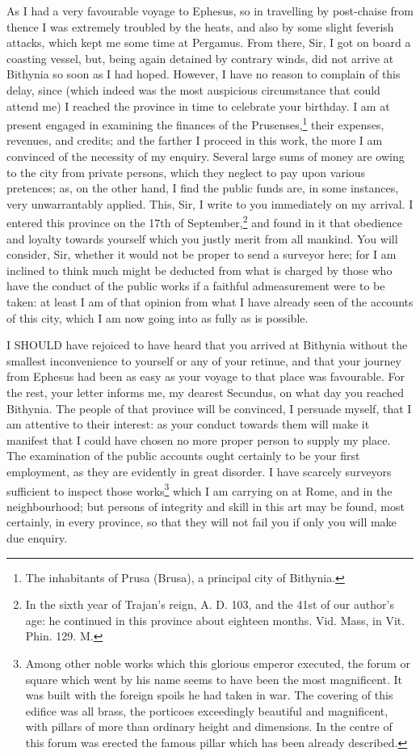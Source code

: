 As I had a very favourable voyage to Ephesus, so in travelling by
post-chaise from thence I was extremely troubled by the heats, and also by
some slight feverish attacks, which kept me some time at Pergamus. From
there, Sir, I got on board a coasting vessel, but, being again detained by
contrary winds, did not arrive at Bithynia so soon as I had hoped.
However, I have no reason to complain of this delay, since (which indeed
was the most auspicious circumstance that could attend me) I reached the
province in time to celebrate your birthday. I am at present engaged in
examining the finances of the Prusenses,\footnote{The inhabitants of
Prusa (Brusa), a principal city of Bithynia.} their expenses,
revenues, and credits; and the farther I proceed in this work, the more I
am convinced of the necessity of my enquiry. Several large sums of money
are owing to the city from private persons, which they neglect to pay upon
various pretences; as, on the other hand, I find the public funds are, in
some instances, very unwarrantably applied. This, Sir, I write to you
immediately on my arrival. I entered this province on the 17th of
September,\footnote{In the sixth year of
Trajan's reign, A. D. 103, and the 41st of our author's age: he continued
in this province about eighteen months. Vid. Mass, in Vit. Phin. 129. M.} and found in it that obedience and
loyalty towards yourself which you justly merit from all mankind. You will
consider, Sir, whether it would not be proper to send a surveyor here; for
I am inclined to think much might be deducted from what is charged by
those who have the conduct of the public works if a faithful admeasurement
were to be taken: at least I am of that opinion from what I have already
seen of the accounts of this city, which I am now going into as fully as
is possible.


I SHOULD have rejoiced to have heard that you arrived at Bithynia without
the smallest inconvenience to yourself or any of your retinue, and that
your journey from Ephesus had been as easy as your voyage to that place
was favourable. For the rest, your letter informs me, my dearest Secundus,
on what day you reached Bithynia. The people of that province will be
convinced, I persuade myself, that I am attentive to their interest: as
your conduct towards them will make it manifest that I could have chosen
no more proper person to supply my place. The examination of the public
accounts ought certainly to be your first employment, as they are
evidently in great disorder. I have scarcely surveyors sufficient to
inspect those works\footnote{Among other noble
works which this glorious emperor executed, the forum or square which went
by his name seems to have been the most magnificent. It was built with the
foreign spoils he had taken in war. The covering of this edifice was all
brass, the porticoes exceedingly beautiful and magnificent, with pillars
of more than ordinary height and dimensions. In the centre of this forum
was erected the famous pillar which has been already described.} which I am carrying on at Rome, and in
the neighbourhood; but persons of integrity and skill in this art may be
found, most certainly, in every province, so that they will not fail you
if only you will make due enquiry.

